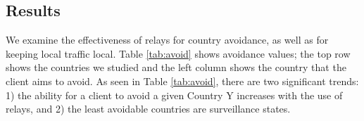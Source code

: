 \subsection{Results}

We examine the
effectiveness of relays for country avoidance, as well as for keeping local
traffic local.  Table \ref{tab:avoid} shows avoidance values; the top
row shows the countries we studied and the left column shows the country
that the client aims to avoid.
%
As seen in Table \ref{tab:avoid}, there are two significant trends: 1) the ability for a client to avoid a given Country Y increases with the use of relays, and 2) the least avoidable countries are surveillance states. 

\begin{table*}[t]
\tiny
\centering
{}
\end{table*}
